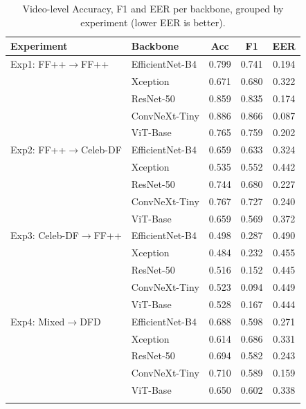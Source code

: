 \begin{table}[!htbp]
\caption{Video-level Accuracy, F1 and EER per backbone, grouped by experiment (lower EER is better).}
\centering
\small
\setlength{\tabcolsep}{3pt}
\begin{tabular}{l l ccc}
\toprule
\textbf{Experiment} & \textbf{Backbone} & \textbf{Acc} & \textbf{F1} & \textbf{EER} \\
\midrule
Exp1: FF++$\to$FF++ & EfficientNet-B4 & 0.799 & 0.741 & 0.194 \\
 & Xception & 0.671 & 0.680 & 0.322 \\
 & ResNet-50 & 0.859 & 0.835 & 0.174 \\
 & ConvNeXt-Tiny & 0.886 & 0.866 & 0.087 \\
 & ViT-Base & 0.765 & 0.759 & 0.202 \\
\midrule
Exp2: FF++$\to$Celeb-DF & EfficientNet-B4 & 0.659 & 0.633 & 0.324 \\
 & Xception & 0.535 & 0.552 & 0.442 \\
 & ResNet-50 & 0.744 & 0.680 & 0.227 \\
 & ConvNeXt-Tiny & 0.767 & 0.727 & 0.240 \\
 & ViT-Base & 0.659 & 0.569 & 0.372 \\
\midrule
Exp3: Celeb-DF$\to$FF++ & EfficientNet-B4 & 0.498 & 0.287 & 0.490 \\
 & Xception & 0.484 & 0.232 & 0.455 \\
 & ResNet-50 & 0.516 & 0.152 & 0.445 \\
 & ConvNeXt-Tiny & 0.523 & 0.094 & 0.449 \\
 & ViT-Base & 0.528 & 0.167 & 0.444 \\
\midrule
Exp4: Mixed$\to$DFD & EfficientNet-B4 & 0.688 & 0.598 & 0.271 \\
 & Xception & 0.614 & 0.686 & 0.331 \\
 & ResNet-50 & 0.694 & 0.582 & 0.243 \\
 & ConvNeXt-Tiny & 0.710 & 0.589 & 0.159 \\
 & ViT-Base & 0.650 & 0.602 & 0.338 \\
\botrule
\end{tabular}
\label{tab:main_full}
\end{table}

